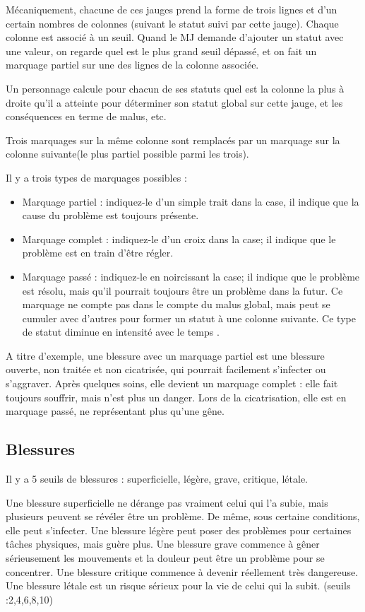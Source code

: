 \documentclass[10pt,a4paper,twocolumn]{book}
\begin{document}
Mécaniquement, chacune de ces jauges prend la forme de trois lignes et d'un certain nombres de colonnes (suivant le statut suivi par cette jauge). Chaque colonne est associé à un seuil. Quand le MJ demande d'ajouter un statut avec une valeur, on regarde quel est le plus grand seuil dépassé, et on fait un marquage partiel sur une des lignes de la colonne associée. 

Un personnage calcule pour chacun de ses statuts quel est la colonne la plus à droite qu'il a atteinte pour déterminer son statut global sur cette jauge, et les conséquences en terme de malus, etc.

Trois marquages sur la même colonne sont remplacés par un marquage sur la colonne suivante(le plus partiel possible parmi les trois).

Il y a trois types de marquages possibles :
\begin{itemize}
\item Marquage partiel : indiquez-le d'un simple trait dans la case, il indique que la cause du problème est toujours présente.
\item Marquage complet : indiquez-le d'un croix dans la case; il indique que le problème est en train d'être régler.
\item Marquage passé : indiquez-le en noircissant la case; il indique que le problème est résolu, mais qu'il pourrait toujours être un problème dans la futur. Ce marquage ne compte pas dans le compte du malus global, mais peut se cumuler avec d'autres pour former un statut à une colonne suivante. Ce type de statut diminue en intensité avec le temps .
\end{itemize}

A titre d'exemple, une blessure avec un marquage partiel est une blessure ouverte, non traitée et non cicatrisée, qui pourrait facilement s'infecter ou s'aggraver. Après quelques soins, elle devient un marquage complet : elle fait toujours souffrir, mais n'est plus un danger. Lors de la cicatrisation, elle est en marquage passé, ne représentant plus qu'une gêne.
\subsection{Blessures}
Il y a 5 seuils de blessures : superficielle, légère, grave, critique, létale.

Une blessure superficielle ne dérange pas vraiment celui qui l'a subie, mais plusieurs peuvent se révéler être un problème. De même, sous certaine conditions, elle peut s'infecter. Une blessure légère peut poser des problèmes pour certaines tâches physiques, mais guère plus. Une blessure grave commence à gêner sérieusement les mouvements et la douleur peut être un problème pour se concentrer. Une blessure critique commence à devenir réellement très dangereuse. Une blessure létale est un risque sérieux pour la vie de celui qui la subit. (seuils :2,4,6,8,10)
\end{document}
